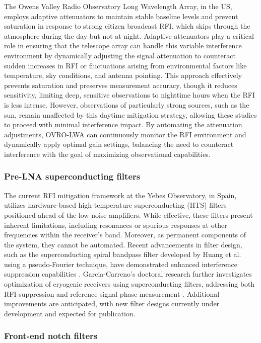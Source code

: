 The Owens Valley Radio Observatory Long Wavelength Array, in the US, employs adaptive attenuators to maintain stable baseline levels and prevent saturation in response to strong citizen broadcast RFI, which skips through the atmosphere during the day but not at night. Adaptive attenuators play a critical role in ensuring that the telescope array can handle this variable interference environment by dynamically adjusting the signal attenuation to counteract sudden increases in RFI or fluctuations arising from environmental factors like temperature, sky conditions, and antenna pointing. This approach effectively prevents saturation and preserves measurement accuracy, though it reduces sensitivity, limiting deep, sensitive observations to nighttime hours when the RFI is less intense. However, observations of particularly strong sources, such as the sun, remain unaffected by this daytime mitigation strategy, allowing these studies to proceed with minimal interference impact. By automating the attenuation adjustments, OVRO-LWA can continuously monitor the RFI environment and dynamically apply optimal gain settings, balancing the need to counteract interference with the goal of maximizing observational capabilities.

\subsubsection{Pre-LNA superconducting filters}
The current RFI mitigation framework at the Yebes Observatory, in Spain, utilizes hardware-based high-temperature superconducting (HTS) filters positioned ahead of the low-noise amplifiers. While effective, these filters present inherent limitations, including resonances or spurious responses at other frequencies within the receiver’s band. Moreover, as permanent components of the system, they cannot be automated. Recent advancements in filter design, such as the superconducting spiral bandpass filter developed by Huang et al. using a pseudo-Fourier technique, have demonstrated enhanced interference suppression capabilities \cite{huang2018superconducting}. Garcia-Carreno’s doctoral research further investigates optimization of cryogenic receivers using superconducting filters, addressing both RFI suppression and reference signal phase measurement \cite{huang2018superconducting}. Additional improvements are anticipated, with new filter designs currently under development and expected for publication.

\subsubsection{Front-end notch filters}

